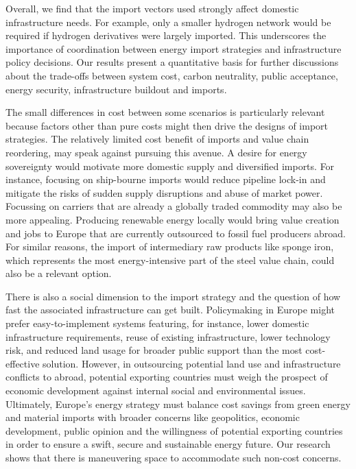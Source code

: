 \documentclass[5p,10pt]{elsarticle}
\begin{document}
Overall, we find that the import vectors used strongly affect domestic
infrastructure needs. For example, only a smaller hydrogen network would be
required if hydrogen derivatives were largely imported. This underscores the
importance of coordination between energy import strategies and infrastructure
policy decisions. Our results present a quantitative basis for further
discussions about the trade-offs between system cost, carbon neutrality, public
acceptance, energy security, infrastructure buildout and imports.

The small differences in cost between some scenarios is particularly relevant
because factors other than pure costs might then drive the designs of import
strategies. The relatively limited cost benefit of imports and value chain
reordering, may speak against pursuing this avenue. A desire for energy
sovereignty would motivate more domestic supply and diversified imports. For
instance, focusing on ship-bourne imports would reduce pipeline lock-in and
mitigate the risks of sudden supply disruptions and abuse of market power.
Focussing on carriers that are already a globally traded commodity may also be
more appealing. Producing renewable energy locally would bring value creation
and jobs to Europe that are currently outsourced to fossil fuel producers
abroad. For similar reasons, the import of intermediary raw products like sponge
iron, which represents the most energy-intensive part of the steel value chain,
could also be a relevant option.

There is also a social dimension to the import strategy and the question of how
fast the associated infrastructure can get built. Policymaking in Europe might
prefer easy-to-implement systems featuring, for instance, lower domestic
infrastructure requirements, reuse of existing infrastructure, lower technology
risk, and reduced land usage for broader public support than the most
cost-effective solution. However, in outsourcing potential land use and
infrastructure conflicts to abroad, potential exporting countries must weigh the
prospect of economic development against internal social and environmental
issues. Ultimately, Europe's energy strategy must balance cost savings from
green energy and material imports with broader concerns like geopolitics,
economic development, public opinion and the willingness of potential exporting
countries in order to ensure a swift, secure and sustainable energy future. Our
research shows that there is maneuvering space to accommodate such non-cost
concerns.
\end{document}
